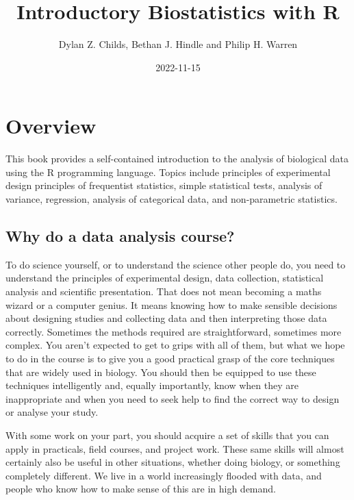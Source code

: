 \documentclass[
]{book}
\title{Introductory Biostatistics with R}
\author{Dylan Z. Childs, Bethan J. Hindle and Philip H. Warren}
\date{2022-11-15}
\begin{document}
\maketitle

{
\setcounter{tocdepth}{1}
\tableofcontents
}
\hypertarget{overview}{%
\chapter*{Overview}\label{overview}}

This book provides a self-contained introduction to the analysis of biological data using the R programming language. Topics include principles of experimental design principles of frequentist statistics, simple statistical tests, analysis of variance, regression, analysis of categorical data, and non-parametric statistics.

\hypertarget{why-do-a-data-analysis-course}{%
\section*{Why do a data analysis course?}\label{why-do-a-data-analysis-course}}

To do science yourself, or to understand the science other people do, you need to understand the principles of experimental design, data collection, statistical analysis and scientific presentation. That does not mean becoming a maths wizard or a computer genius. It means knowing how to make sensible decisions about designing studies and collecting data and then interpreting those data correctly. Sometimes the methods required are straightforward, sometimes more complex. You aren't expected to get to grips with all of them, but what we hope to do in the course is to give you a good practical grasp of the core techniques that are widely used in biology. You should then be equipped to use these techniques intelligently and, equally importantly, know when they are inappropriate and when you need to seek help to find the correct way to design or analyse your study.

With some work on your part, you should acquire a set of skills that you can apply in practicals, field courses, and project work. These same skills will almost certainly also be useful in other situations, whether doing biology, or something completely different. We live in a world increasingly flooded with data, and people who know how to make sense of this are in high demand.
\end{document}
